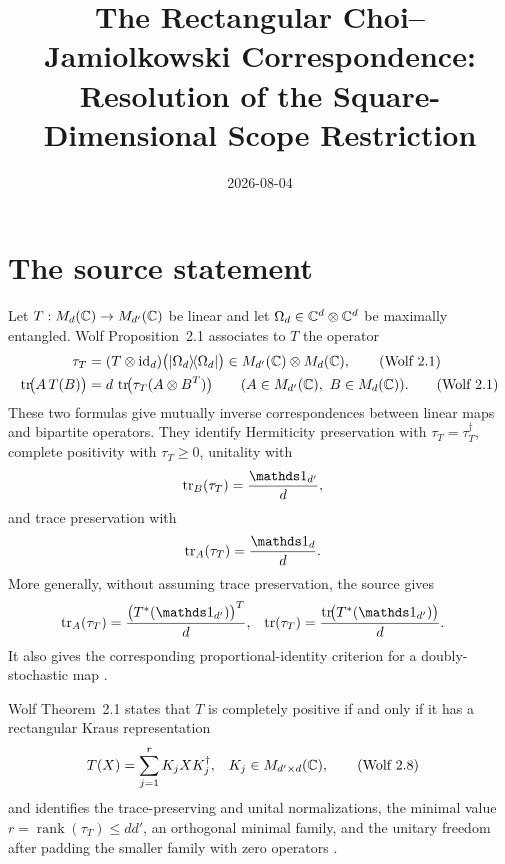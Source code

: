 \documentclass{article}
\title{The Rectangular Choi--Jamiolkowski Correspondence:\\
Resolution of the Square-Dimensional Scope Restriction}
\author{}
\date{2026-08-04}
\begin{document}
\maketitle
{}

\section{The source statement}

Let $T:M_{d}(\mathbb{C})\to M_{d'}(\mathbb{C})$ be linear and let
$\Omega_d\in\mathbb{C}^d\otimes\mathbb{C}^d$ be maximally entangled.  Wolf
Proposition~2.1 associates to $T$ the operator
\begin{align}
    \tau_T
      &= (T\otimes\operatorname{id}_d)
         \bigl(|\Omega_d\rangle\!\langle \Omega_d|\bigr)
       \in M_{d'}(\mathbb{C})\otimes M_{d}(\mathbb{C}),
    \tag{Wolf 2.1}\\
    \operatorname{tr}\!\bigl(A\,T(B)\bigr)
      &= d\,\operatorname{tr}\!\bigl(\tau_T(A\otimes B^{T})\bigr)
    \qquad
    (A\in M_{d'}(\mathbb{C}),\ B\in M_{d}(\mathbb{C})).
    \tag{Wolf 2.1}
\end{align}
These two formulas give mutually inverse correspondences between linear maps
and bipartite operators.  They identify Hermiticity preservation with
$\tau_T=\tau_T^\dagger$, complete positivity with $\tau_T\geq0$, unitality
with
\begin{align}
    \tr_B(\tau_T)&=\frac{\Id_{d'}}{d},
\end{align}
and trace preservation with
\begin{align}
    \tr_A(\tau_T)&=\frac{\Id_d}{d}.
\end{align}
More generally, without assuming trace preservation, the source gives
\begin{align}
    \tr_A(\tau_T)
      &= \frac{\bigl(T^*(\Id_{d'})\bigr)^T}{d},
    &
    \tr(\tau_T)
      &= \frac{\tr\!\bigl(T^*(\Id_{d'})\bigr)}{d}.
\end{align}
It also gives the corresponding proportional-identity criterion for a
doubly-stochastic map \cite[Proposition~2.1]{Wolf2012Quantum}.

Wolf Theorem~2.1 states that $T$ is completely positive if and only if it
has a rectangular Kraus representation
\begin{align}
    T(X)&=\sum_{j=1}^{r}K_jXK_j^\dagger,
    &K_j&\in M_{d'\times d}(\mathbb{C}),
    \tag{Wolf 2.8}
\end{align}
and identifies the trace-preserving and unital normalizations, the minimal
value $r=\operatorname{rank}(\tau_T)\leq dd'$, an orthogonal minimal family,
and the unitary freedom after padding the smaller family with zero
operators \cite[Theorem~2.1]{Wolf2012Quantum}.
\end{document}
